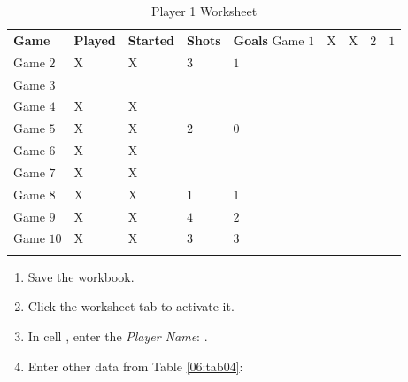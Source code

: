 \begin{table}[H]
	{\small
		\begin{longtable}{L{0.65in}C{0.45in}C{0.50in}C{0.40in}C{0.40in}} %
			\textbf{Game} & \textbf{Played} & \textbf{Started} & \textbf{Shots} & \textbf{Goals}\endhead
			\hline
			Game $ 1  $  & X & X & $ 2 $ & $ 1 $ \\
			Game $ 2  $  & X & X & $ 3 $ & $ 1 $ \\
			Game $ 3  $  &   &   &       &       \\
			Game $ 4  $  & X & X &       &       \\
			Game $ 5  $  & X & X & $ 2 $ & $ 0 $ \\
			Game $ 6  $  & X & X &       &       \\
			Game $ 7  $  & X & X &       &       \\
			Game $ 8  $  & X & X & $ 1 $ & $ 1 $ \\
			Game $ 9  $  & X & X & $ 4 $ & $ 2 $ \\
			Game $ 10 $  & X & X & $ 3 $ & $ 3 $ \\
			\caption{Player 1 Worksheet}
			\label{06:tab03}
		\end{longtable}
	}
\end{table}

\begin{enumbox}
	\begin{enumerate}
		\item Save the  workbook.
		\item Click the  worksheet tab to activate it. 
		\item In cell , enter the \textit{Player Name}: . 
		\item Enter other data from Table \ref{06:tab04}:
	\end{enumerate}
\end{enumbox}

